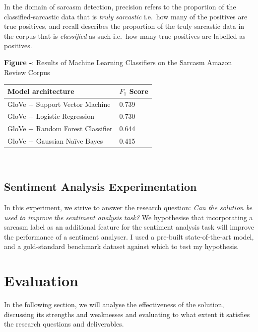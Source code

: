 \documentclass[12pt,a4paper]{article}
\begin{document}
\noindent In the domain of sarcasm detection, precision refers to the proportion of the classified-sarcastic data that is \textit{truly sarcastic} i.e.\ how many of the positives are true positives, and recall describes the proportion of the truly sarcastic data in the corpus that is \textit{classified} as such i.e.\ how many true positives are labelled as positives. \\


\begin{center}
	\textbf{Figure -}: Results of Machine Learning Classifiers on the Sarcasm Amazon Review Corpus
\end{center}
\begin{center}
	\begin{tabular}{p{8cm}p{2cm}}
		\hline
		\textbf{Model architecture} & \textbf{$F_{1}$ Score}\\
		\hline\hline
		GloVe + Support Vector Machine & 0.739\\
		\hline
		GloVe + Logistic Regression & 0.730\\
		\hline
		GloVe + Random Forest Classifier & 0.644\\
		\hline
		GloVe + Gaussian Na\"{i}ve Bayes & 0.415\\
		\hline
	\end{tabular}\\
\end{center}

\subsection{Sentiment Analysis Experimentation}
In this experiment, we strive to answer the research question: \textit{Can the solution be used to improve the sentiment analysis task?} We hypothesise that incorporating a sarcasm label as an additional feature for the sentiment analysis task will improve the performance of a sentiment analyser. I used a pre-built state-of-the-art model, and a gold-standard benchmark dataset against which to test my hypothesis.



\section{Evaluation}
In the following section, we will analyse the effectiveness of the solution, discussing its strengths and weaknesses and evaluating to what extent it satisfies the research questions and deliverables.
\end{document}
